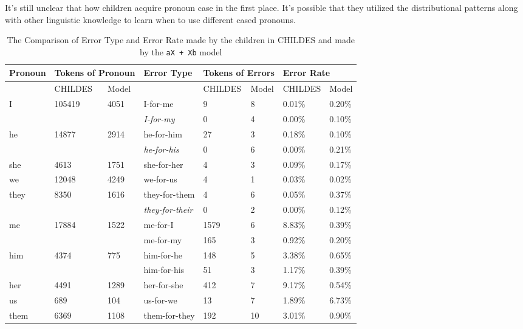 It's still unclear that how children acquire pronoun case in the first place. It's possible that they utilized the distributional patterns along with other linguistic knowledge to learn when to use different cased pronouns. 
\FloatBarrier
\begin{table}[!h]
\centering
\caption{The Comparison of Error Type and Error Rate made by the children in CHILDES and made by the \texttt{aX + Xb} model}
\label{tab:hopelast}
\begin{tabular}{l|ll|l|ll|ll}
\toprule
Pronoun & \multicolumn{2}{l|}{Tokens of Pronoun} & Error Type & \multicolumn{2}{l|}{Tokens of Errors} & \multicolumn{2}{l|}{Error Rate} \\ \hline
 & CHILDES & Model &  & CHILDES & Model & CHILDES & Model \\
\multirow{2}{*}{I} & \multirow{2}{*}{105419} & \multirow{2}{*}{4051} & I-for-me & 9 & 8 & 0.01\% & 0.20\% \\
 &  &  & \textit{I-for-my} & 0 & 4 & 0.00\% & 0.10\% \\
\multirow{2}{*}{he} & \multirow{2}{*}{14877} & \multirow{2}{*}{2914} & he-for-him & 27 & 3 & 0.18\% & 0.10\% \\
 &  &  & \textit{he-for-his} & 0 & 6 & 0.00\% & 0.21\% \\
she & 4613 & 1751 & she-for-her & 4 & 3 & 0.09\% & 0.17\% \\
we & 12048 & 4249 & we-for-us & 4 & 1 & 0.03\% & 0.02\% \\
\multirow{2}{*}{they} & \multirow{2}{*}{8350} & \multirow{2}{*}{1616} & they-for-them & 4 & 6 & 0.05\% & 0.37\% \\
 &  &  & \textit{they-for-their} & 0 & 2 & 0.00\% & 0.12\% \\
\multirow{2}{*}{me} & \multirow{2}{*}{17884} & \multirow{2}{*}{1522} & me-for-I & 1579 & 6 & 8.83\% & 0.39\% \\
 &  &  & me-for-my & 165 & 3 & 0.92\% & 0.20\% \\
\multirow{2}{*}{him} & \multirow{2}{*}{4374} & \multirow{2}{*}{775} & him-for-he & 148 & 5 & 3.38\% & 0.65\% \\
 &  &  & him-for-his & 51 & 3 & 1.17\% & 0.39\% \\
her & 4491 & 1289 & her-for-she & 412 & 7 & 9.17\% & 0.54\% \\
us & 689 & 104 & us-for-we & 13 & 7 & 1.89\% & 6.73\% \\
\multirow{2}{*}{them} & \multirow{2}{*}{6369} & \multirow{2}{*}{1108} & them-for-they & 192 & 10 & 3.01\% & 0.90\% \\

\end{tabular}
\end{table}
